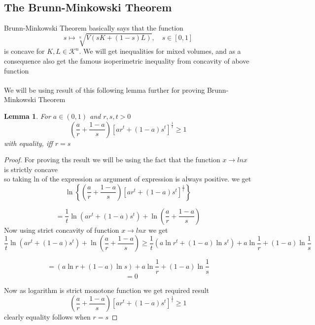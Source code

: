 \documentclass[oneside]{book}
\newtheorem{lemma}[theorem]{Lemma}
\begin{document}
	\subsection{The Brunn-Minkowski Theorem}
	\label{ss:21}
	Brunn-Minkowski Theorem  basically says that the function 
	\[s  \mapsto \sqrt[n]{V(s K+(1- s) L)}, \quad s \in[0,1]
	\]
	is concave for $ K, L \in \mathcal{K}^n $.
	We will get inequalities for mixed volumes, and as a consequence also get the famous isoperimetric inequality from concavity of above function
	\\\\
	We will be using result of this following lemma further for proving Brunn-Minkowski Theorem
	\begin{lemma} 
		\label{l:2}
		For $a \in(0,1)$ and $r, s, t>0$
		\[
		\left(\frac{a}{r}+\frac{1-a}{s}\right)\left[a r^{t}+(1-a) s^{t}\right]^{\frac{1}{t}} \geq 1
		\]
		with equality, iff $r=s$
	\end{lemma} 
	\begin{proof}
		
		For proving ths result we will be using the fact that the function $x \rightarrow lnx $ is strictly concave \\
		so taking ln of the expression as argument of expression is always positive. we get 
		$$\ln \left\{\left(\frac{a}{r}+\frac{1-a}{s}\right)\left[a r^{t}+(1-a) s^{t}\right]^{\frac{1}{t}}\right\}$$
		
		$$ =\frac{1}{t} \ln \left(a r^{t}+(1-a) s^{t}\right)+\ln \left(\frac{a}{r}+\frac{1-a}{s}\right)$$
		Now using strict concavity of  function  $x \rightarrow lnx $ we get 
		$$\frac{1}{t} \ln \left(a r^{t}+(1-a) s^{t}\right)+\ln \left(\frac{a}{r}+\frac{1-a}{s}\right)
		\geq \frac{1}{t}\left(a \ln r^{t}+(1-a) \ln s^{t}\right)+a \ln \frac{1}{r}+(1-a) \ln \frac{1}{s}$$
		
		
		$$ =  \left(a \ln r+(1-a) \ln s\right)+a \ln \frac{1}{r}+(1-a) \ln \frac{1}{s}$$
		$$\quad = 0$$
		
		Now as logarithm is strict monotone function we get required result 
		\[
		\left(\frac{a}{r}+\frac{1-a}{s}\right)\left[a r^{t}+(1-a) s^{t}\right]^{\frac{1}{t}} \geq 1
		\]
		clearly equality follows when $r = s $
	\end{proof}
	
	
	
	
	
	
	
	
	
\end{document}
